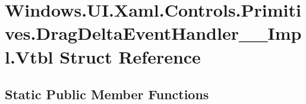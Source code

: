 \hypertarget{struct_windows_1_1_u_i_1_1_xaml_1_1_controls_1_1_primitives_1_1_drag_delta_event_handler_____impl_1_1_vtbl}{}\section{Windows.\+U\+I.\+Xaml.\+Controls.\+Primitives.\+Drag\+Delta\+Event\+Handler\+\_\+\+\_\+\+Impl.\+Vtbl Struct Reference}
\label{struct_windows_1_1_u_i_1_1_xaml_1_1_controls_1_1_primitives_1_1_drag_delta_event_handler_____impl_1_1_vtbl}
\subsection*{Static Public Member Functions}
